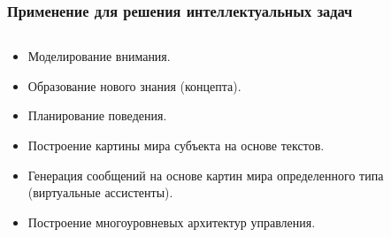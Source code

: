 \documentclass[default]{beamer}
\begin{document}
	\begin{frame}
		\frametitle{Применение для решения интеллектуальных задач}
		\vspace{-5pt}
		\footnotesize
		\begin{columns}
			\begin{column}{0.5\textwidth}
				\begin{itemize}
					\item Моделирование внимания.
					\item Образование нового знания (концепта).
					\item Планирование поведения.
					\item Построение картины мира субъекта на основе текстов.
					\item Генерация сообщений на основе картин мира определенного типа (виртуальные ассистенты).
					\item Построение многоуровневых архитектур управления.
				\end{itemize}
				

\end{column}
\end{columns}
\end{frame}
\end{document}
